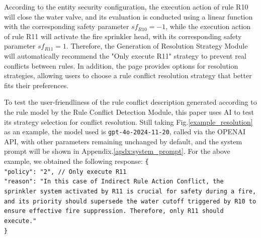 According to the entity security configuration, the execution action of rule R10 will close the water valve, and its evaluation is conducted using a linear function with the corresponding safety parameter $sf_{R10}=-1$, while the execution action of rule R11 will activate the fire sprinkler head, with its corresponding safety parameter $sf_{R11}=1$. Therefore, the Generation of Resolution Strategy Module will automatically recommend the "Only execute R11" strategy to prevent real conflicts between rules. In addition, the page provides options for resolution strategies, allowing users to choose a rule conflict resolution strategy that better fits their preferences.

To test the user-friendliness of the rule conflict description generated according to the rule model by the Rule Conflict Detection Module, this paper uses AI to test its strategy selection for conflict resolution. Still taking Fig.\ref{example_resolution} as an example, the model used is \texttt{gpt-4o-2024-11-20}, called via the OPENAI API, with other parameters remaining unchanged by default, and the system prompt will be shown in Appendix.\ref{apdx:system_prompt}. For the above example, we obtained the following response: 
\texttt{\{\\
	"policy": "2", // Only execute R11 \\
	"reason": "In this case of Indirect Rule Action Conflict, the sprinkler system activated by R11 is crucial for safety during a fire, and its priority should supersede the water cutoff triggered by R10 to ensure effective fire suppression. Therefore, only R11 should execute."\\
	\}}\\

